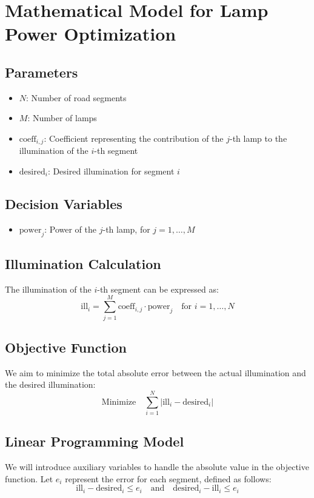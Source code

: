 \documentclass{article}
\begin{document}
\section*{Mathematical Model for Lamp Power Optimization}

\subsection*{Parameters}
\begin{itemize}
    \item \( N \): Number of road segments
    \item \( M \): Number of lamps
    \item \( \text{coeff}_{i,j} \): Coefficient representing the contribution of the \( j \)-th lamp to the illumination of the \( i \)-th segment
    \item \( \text{desired}_i \): Desired illumination for segment \( i \)
\end{itemize}

\subsection*{Decision Variables}
\begin{itemize}
    \item \( \text{power}_j \): Power of the \( j \)-th lamp, for \( j = 1, \ldots, M \)
\end{itemize}

\subsection*{Illumination Calculation}
The illumination of the \( i \)-th segment can be expressed as:
\[
\text{ill}_i = \sum_{j=1}^{M} \text{coeff}_{i,j} \cdot \text{power}_j \quad \text{for } i = 1, \ldots, N
\]

\subsection*{Objective Function}
We aim to minimize the total absolute error between the actual illumination and the desired illumination:
\[
\text{Minimize} \quad \sum_{i=1}^{N} |\text{ill}_i - \text{desired}_i|
\]

\subsection*{Linear Programming Model}
We will introduce auxiliary variables to handle the absolute value in the objective function. Let \( e_i \) represent the error for each segment, defined as follows:
\[
\text{ill}_i - \text{desired}_i \leq e_i \quad \text{and} \quad \text{desired}_i - \text{ill}_i \leq e_i
\]
\end{document}
